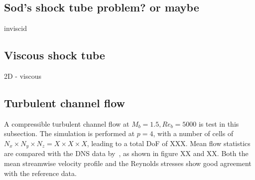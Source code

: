 \documentclass[lineno]{jfm}
\begin{document}
\subsection{Sod's shock tube problem? or maybe}
inviscid 
\subsection{Viscous shock tube}
2D - viscous
\subsection{Turbulent channel flow}
A compressible turbulent channel flow at $M_b = 1.5, Re_b = 5000$ is test in this subsection. The simulation is performed at $p = 4$, with a number of cells of $N_x \times N_y \times N_z = X \times X \times X$, leading to a total DoF of XXX. Mean flow statistics are compared with the DNS data by~\citet{2021_ChenScalo_JFM}, as shown in figure XX and XX. Both the mean streamwise velocity profile and the Reynolds stresses show good agreement with the reference data. 




\end{document}
